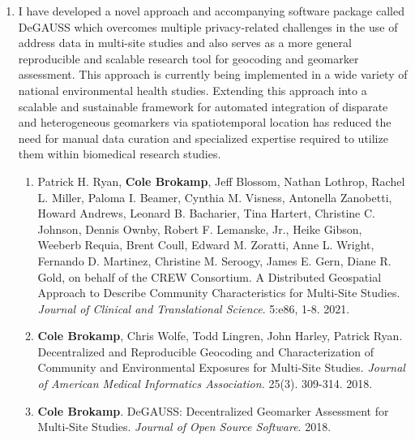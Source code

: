 \documentclass{nihbiosketch}
\begin{document}
\begin{enumerate}
\begin{enumerate}

  \end{enumerate}

\item I have developed a novel approach and accompanying software package called DeGAUSS
  which overcomes multiple privacy-related challenges in the use of address data in
  multi-site studies and also serves as a more general reproducible and scalable
  research tool for geocoding and geomarker assessment. This approach is currently being
  implemented in a wide variety of national environmental health studies. Extending this
  approach into a scalable and sustainable framework for automated integration of
  disparate and heterogeneous geomarkers via spatiotemporal location has reduced
  the need for manual data curation and specialized expertise required
  to utilize them within biomedical research studies.

\begin{enumerate}
	
\item Patrick H. Ryan, \textbf{Cole Brokamp}, Jeff Blossom, Nathan Lothrop,
  Rachel L. Miller, Paloma I. Beamer, Cynthia M. Visness, Antonella
  Zanobetti, Howard Andrews, Leonard B. Bacharier, Tina Hartert, Christine
  C. Johnson, Dennis Ownby, Robert F. Lemanske, Jr., Heike Gibson, Weeberb
  Requia, Brent Coull, Edward M. Zoratti, Anne L. Wright, Fernando D.
  Martinez, Christine M. Seroogy, James E. Gern, Diane R. Gold, on behalf
  of the CREW Consortium. A Distributed Geospatial Approach to Describe
  Community Characteristics for Multi-Site Studies. \textit{Journal of
    Clinical and Translational Science}. 5:e86, 1-8. 2021.

  \item \textbf{Cole Brokamp}, Chris Wolfe, Todd Lingren, John Harley, Patrick Ryan. Decentralized and Reproducible Geocoding and Characterization of Community and Environmental Exposures for Multi-Site Studies. \textit{Journal of American Medical Informatics Association.} 25(3). 309-314. 2018.
	
  \item \textbf{Cole Brokamp}. DeGAUSS: Decentralized Geomarker Assessment for Multi-Site Studies. \textit{Journal of Open Source Software}. 2018. 


\end{enumerate}
\end{enumerate}
\end{document}
